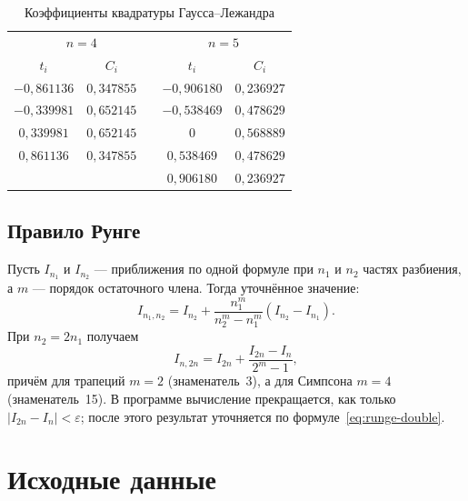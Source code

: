 \documentclass[14pt,a4paper]{extarticle}
\begin{document}
\begin{table}[H]
    \centering
    \caption{Коэффициенты квадратуры Гаусса--Лежандра}
    \label{tab:gauss-nodes}
    \begin{tabular}{c|cc|cc}
        \toprule
        \multicolumn{3}{c|}{$n=4$} & \multicolumn{2}{c}{$n=5$}\\
        $t_i$ & $C_i$ & & $t_i$ & $C_i$\\
        \midrule
        $-0{,}861136$ & $0{,}347855$ & & $-0{,}906180$ & $0{,}236927$\\
        $-0{,}339981$ & $0{,}652145$ & & $-0{,}538469$ & $0{,}478629$\\
        $ 0{,}339981$ & $0{,}652145$ & & $ 0$          & $0{,}568889$\\
        $ 0{,}861136$ & $0{,}347855$ & & $ 0{,}538469$ & $0{,}478629$\\
        & & & $ 0{,}906180$ & $0{,}236927$\\
        \bottomrule
    \end{tabular}
\end{table}

\subsection{Правило Рунге}

Пусть $I_{n_1}$ и $I_{n_2}$ --- приближения по одной формуле при
$n_1$ и $n_2$ частях разбиения, а $m$ --- порядок остаточного члена.
Тогда уточнённое значение:
\begin{equation}
    I_{n_1,n_2}=I_{n_2}+\frac{n_1^m}{n_2^m-n_1^m}
                           \left(I_{n_2}-I_{n_1}\right).
    \label{eq:runge}
\end{equation}
При $n_2=2n_1$ получаем
\begin{equation}
    I_{n,2n}=I_{2n}+\frac{I_{2n}-I_n}{2^m-1},
    \label{eq:runge-double}
\end{equation}
причём для трапеций $m=2$ (знаменатель~3), а для Симпсона $m=4$
(знаменатель~15). В программе вычисление прекращается, как только
$|I_{2n}-I_n|<\varepsilon$; после этого результат уточняется по
формуле~\eqref{eq:runge-double}.

\section{Исходные данные}
\end{document}
